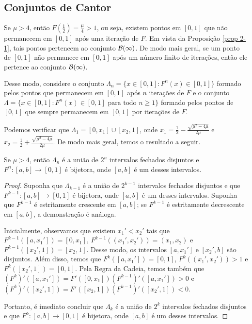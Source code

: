 \subsection{Conjuntos de Cantor}

Se $\mu > 4$, então $F(\frac{1}{2}) = \frac{\mu}{4} > 1$, ou seja, existem pontos em $[0, 1]$ que não permanecem em $[0, 1]$ após uma iteração de $F$. Em vista da Proposição \ref{prop 2-1}, tais pontos pertencem ao conjunto $\mathcal{B}(\infty)$. De modo mais geral, se um ponto de $[0, 1]$ não permanece em $[0, 1]$ após um número finito de iterações, então ele pertence ao conjunto $\mathcal{B}(\infty)$. 

Desse modo, considere o conjunto $\Lambda_n = \{x \in [0, 1] : F^n(x) \in [0, 1]\}$ formado pelos pontos que permanecem em $[0, 1]$ após $n$ iterações de $F$ e o conjunto $\Lambda =  \{x \in [0, 1] : F^n(x) \in [0, 1] \textrm{ para todo } n \geq 1\}$ formado pelos pontos de $[0, 1]$ que sempre permanecem em $[0, 1]$ por iterações de $F$.

Podemos verificar que $\Lambda_1 = [0, x_1] \cup [x_2, 1]$, onde $x_1 = \frac{1}{2} - \frac{\sqrt{\mu^2 - 4\mu}}{2\mu}$ e $x_2 = \frac{1}{2} + \frac{\sqrt{\mu^2 - 4\mu}}{2\mu}$. De modo mais geral, temos o resultado a seguir.

\begin{proposition} \label{proposicao conjuntosdecantor 1}
Se $\mu > 4$, então $\Lambda_n$ é a união de $2^n$ intervalos fechados disjuntos e $F^n: [a, b] \to [0, 1]$ é bijetora, onde $[a, b]$ é um desses intervalos.
\end{proposition}

\begin{proof}
Suponha que $\Lambda_{k-1}$ é a união de $2^{k-1}$ intervalos fechados disjuntos e que $F^{k-1}: [a, b] \to [0, 1]$ é bijetora, onde $[a, b]$ é um desses intervalos.
Suponha que $F^{k-1}$ é estritamente crescente em $[a, b]$; se $F^{k-1}$ é estritamente decrescente em $[a, b]$, a demonstração é análoga.

Inicialmente, observamos que existem $x_1' < x_2'$ tais que $F^{k-1}([a, x_1']) = [0, x_1]$, $F^{k-1}((x_1', x_2')) = (x_1, x_2)$ e $F^{k-1}([x_2', 1]) = [x_2, 1]$.
Desse modo, os intervalos $[a, x_1']$ e $[x_2', b]$ são disjuntos.
Além disso, temos que $F^k([a, x_1']) = [0, 1]$, $F^k((x_1', x_2')) > 1$  e $F^k([x_2', 1]) = [0, 1]$.
Pela Regra da Cadeia, temos também que $(F^k)'([a, x_1']) = F'([0, x_1])(F^{k-1})'([a, x_1']) > 0$ e $(F^k)'([x_2', 1]) = F'([x_2, 1])(F^{k-1})'([x_2', 1]) < 0$.

Portanto, é imediato concluir que $\Lambda_k$ é a união de $2^k$ intervalos fechados disjuntos e que $F^k: [a, b] \to [0, 1]$ é bijetora, onde $[a, b]$ é um desses intervalos.
\end{proof}

